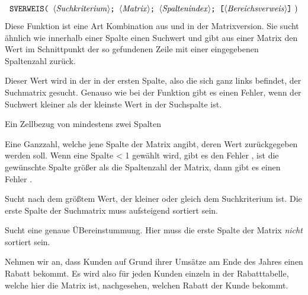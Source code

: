 
\pagebreak
\subsection{}


$$ \text{\stmt{SVERWEIS( \syntax{Suchkriterium}; \syntax{Matrix}; \syntax{Spaltenindex}; [\syntax{Bereichsverweis}]} )}$$
Diese Funktion ist eine Art Kombination aus  und  in der Matrixversion. Sie sucht ähnlich wie  innerhalb einer Spalte einen Suchwert und gibt aus einer Matrix den Wert im Schnittpunkt der so gefundenen Zeile mit einer eingegebenen Spaltenzahl zurück.



\begin{description}[labelindent=0cm, leftmargin=3.5cm, font=\mdseries, labelwidth=3.5cm,style=nextline]
\item[\syntax{Suchkriterium}] Dieser Wert wird in der in der ersten Spalte, also die sich ganz links befindet, der Suchmatrix gesucht. Genauso wie bei der  Funktion gibt es einen  Fehler, wenn der Suchwert kleiner als der kleinste Wert in der Suchspalte ist.
\item[\syntax{Matrix}] Ein Zellbezug von mindestens zwei Spalten
\item[\syntax{Spaltenindex}] Eine Ganzzahl, welche jene Spalte der Matrix angibt, deren Wert zurückgegeben werden soll. Wenn eine Spalte < 1 gewählt wird, gibt es den Fehler , ist die gewünschte Spalte größer als die Spaltenzahl der Matrix, dann gibt es einen Fehler .
\item[\syntax{Bereichsverweis}] %
	\begin{description}[labelindent=0cm, leftmargin=3cm, font=\mdseries, labelwidth=3cm,style=nextline]
	\item[\stmt{WAHR} (default)] Sucht nach dem größtem Wert, der kleiner oder gleich dem Suchkriterium ist. Die erste Spalte der Suchmatrix muss aufsteigend sortiert sein.
	\item[\stmt{FALSCH}] Sucht eine genaue ÜBereinstummung. Hier muss die erste Spalte der Matrix \textit{nicht} sortiert sein.
	\end{description}


\end{description}

Nehmen wir an, dass Kunden auf Grund ihrer Umsätze am Ende des Jahres einen Rabatt bekommt. Es wird also für jeden Kunden einzeln in der Rabatttabelle, welche hier die Matrix ist, nachgesehen, welchen Rabatt der Kunde bekommt. 


